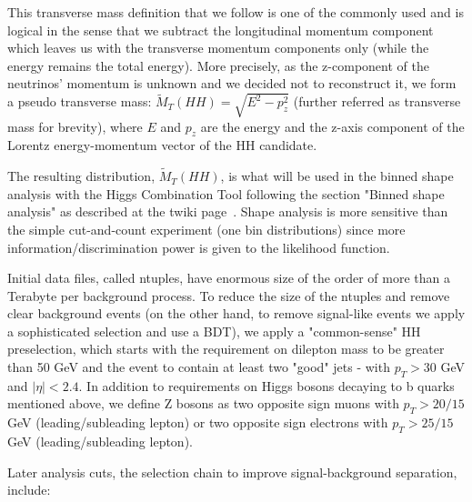 This transverse mass definition that we follow is one of the commonly used and is logical in the sense that we subtract the longitudinal momentum component which leaves us with the transverse momentum components only (while the energy remains the total energy). More precisely, as the z-component of the neutrinos' momentum is unknown and we decided not to reconstruct it, we form a pseudo transverse mass: $\tilde{M}_T(HH) = \sqrt{E^2 - p_{z}^2}$ (further referred as transverse mass for brevity), where $E$ and $p_z$ are the energy and the z-axis component of the Lorentz energy-momentum vector of the HH candidate.

The resulting distribution, $\tilde{M}_T(HH)$, is what will be used in the binned shape analysis with the Higgs Combination Tool following the section "Binned shape analysis" as described at the twiki page~\cite{CombinedLimit}. Shape analysis is more sensitive than the simple cut-and-count experiment (one bin distributions) since more information/discrimination power is given to the likelihood function. 

Initial data files, called ntuples, have enormous size of the order of more than a Terabyte per background process. To reduce the size of the ntuples and remove clear background events (on the other hand, to remove signal-like events we apply a sophisticated selection and use a BDT), we apply a "common-sense" HH preselection, which starts with the requirement on dilepton mass to be greater than 50 GeV and the event to contain at least two "good" jets - with $p_{T} > 30$ GeV and $|\eta| < 2.4$. In addition to requirements on Higgs bosons decaying to b quarks mentioned above, we define Z bosons as two opposite sign muons with $p_{T} > 20/15$ GeV (leading/subleading lepton) or two opposite sign electrons with $p_{T} > 25/15$ GeV (leading/subleading lepton). 



Later analysis cuts, the selection chain to improve signal-background separation, include: 


